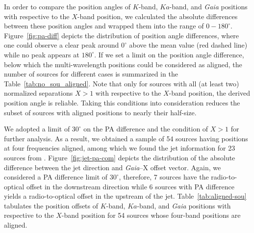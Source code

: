 \documentclass{aa-note}   %
\begin{document}
In order to compare the position angles of $K$-band, $Ka$-band, and \textit{Gaia} positions with respective to the $X$-band position,
we calculated the absolute differences between these position angles and wrapped them into the range of $0-180^\circ$.
Figure~\ref{fig:pa-diff} depicts the distribution of position angle differences, where one could observe a clear peak around $0^\circ$ above the mean value (red dashed line) while no peak appears at $180^\circ$.
If we set a limit on the position angle difference, below which the multi-wavelength positions could be considered as aligned, the number of sources for different cases is summarized in the Table~\ref{tab:no_sou_aligned}.
Note that only for sources with all (at least two) normalized separations $X>1$ with respective to the $X$-band position, the derived position angle is reliable.
Taking this conditions into consideration reduces the subset of sources with aligned positions to nearly their half-size.

We adopted a limit of $30^\circ$ on the PA difference and the condition of $X>1$ for further analysis.
As a result, we obtained a sample of 54 sources having positions at  four frequencies aligned, among which we found the jet information for 23 sources from \citep{2019ApJ...874...43L}.
Figure~\ref{fig:jet-pa-com} depicts the distribution of the absolute difference between the jet direction and \textit{Gaia}--X offset vector.
Again, we considered a PA difference limit of $30^\circ$, therefore, 7 sources have the radio-to-optical offset in the downstream direction while 6 sources with PA difference yields a radio-to-optical offset in the upstream of the jet.
Table~\ref{tab:aligned-sou} tabulates the position offsets of $K$-band, $Ka$-band, and \textit{Gaia} positions with respective to the $X$-band position for 54 sources whose four-band positions are aligned. %
\end{document}
